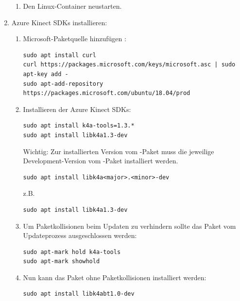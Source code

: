 \begin{enumerate}[label*=\arabic*.]
\begin{enumerate}[label*=\arabic*.]
            \item Den Linux-Container neustarten.
        \end{enumerate}

    \item Azure Kinect SDKs installieren:
        \begin{enumerate}[label*=\arabic*.]
            \item Microsoft-Paketquelle hinzufügen \cite{microsoftazure-kinect-sensor-sdk_installation_nodate}:
                \begin{lstlisting}[style=bash]
sudo apt install curl
curl https://packages.microsoft.com/keys/microsoft.asc | sudo apt-key add -
sudo apt-add-repository https://packages.microsoft.com/ubuntu/18.04/prod
                \end{lstlisting}

            \item Installieren der Azure Kinect SDKs:
                \begin{lstlisting}[style=bash]
sudo apt install k4a-tools=1.3.*
sudo apt install libk4a1.3-dev
                \end{lstlisting}

                \begin{redbox}{Wichtig:}
                    Zur installierten Version vom -Paket muss die jeweilige Development-Version vom -Paket installiert werden.

                    \begin{lstlisting}[style=bash]
sudo apt install libk4a<major>.<minor>-dev
                    \end{lstlisting}

                    z.B.

                    \begin{lstlisting}[style=bash]
sudo apt install libk4a1.3-dev
                    \end{lstlisting}
                \end{redbox}

            \item Um Paketkollisionen beim Updaten zu verhindern sollte das Paket  vom Updateprozess ausgeschlossen werden:
                \begin{lstlisting}[style=bash]
sudo apt-mark hold k4a-tools
sudo apt-mark showhold
                \end{lstlisting}

            \item Nun kann das Paket  ohne Paketkollisionen installiert werden:
                \begin{lstlisting}[style=bash]
sudo apt install libk4abt1.0-dev
                \end{lstlisting}
        \end{enumerate}


\end{enumerate}
